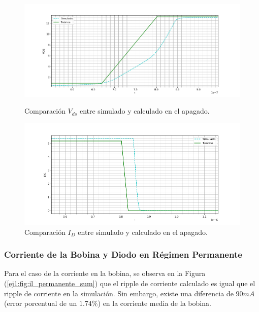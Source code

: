 \begin{figure}[H]
	\centering
	\begin{minipage}{0.5\textwidth}
		\centering
		\includegraphics[width=1.1\textwidth]{ImagenesEjercicio-1/sim_apagado_drain} %
		\caption{Comparación $V_{ds}$ entre simulado y calculado en el apagado.}
		\label{ej1:fig:sim_apagado_drain}
	\end{minipage}\hfill
	\begin{minipage}{0.5\textwidth}
		\centering
		\includegraphics[width=1.1\textwidth]{ImagenesEjercicio-1/sim_apagado_drain_i} %
		\caption{Comparación $I_{D}$ entre simulado y calculado en el apagado.}
		\label{ej1:fig:sim_apagado_drain_i}
	\end{minipage}
\end{figure}

\subsubsection{Corriente de la Bobina y Diodo en Régimen Permanente}

Para el caso de la corriente en la bobina, se observa en la Figura (\ref{ej1:fig:il_permanente_sum}) que el ripple de corriente calculado es igual que el ripple de corriente en la simulación. Sin embargo, existe una diferencia de $90mA$ (error porcentual de un $1.74\%$) en la corriente media de la bobina.

